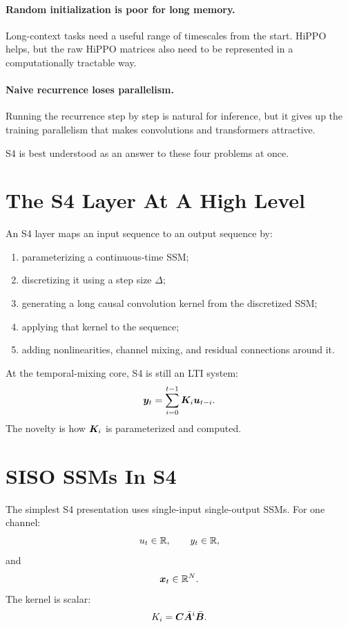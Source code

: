 \paragraph{Random initialization is poor for long memory.}
Long-context tasks need a useful range of timescales from the start. HiPPO helps, but the
raw HiPPO matrices also need to be represented in a computationally tractable way.

\paragraph{Naive recurrence loses parallelism.}
Running the recurrence step by step is natural for inference, but it gives up the training
parallelism that makes convolutions and transformers attractive.

S4 is best understood as an answer to these four problems at once.

\section{The S4 Layer At A High Level}

An S4 layer maps an input sequence to an output sequence by:

\begin{enumerate}
  \item parameterizing a continuous-time SSM;
  \item discretizing it using a step size $\Delta$;
  \item generating a long causal convolution kernel from the discretized SSM;
  \item applying that kernel to the sequence;
  \item adding nonlinearities, channel mixing, and residual connections around it.
\end{enumerate}

At the temporal-mixing core, S4 is still an LTI system:
\[
  \bm{y}_t = \sum_{i=0}^{t-1}\bm{K}_i\bm{u}_{t-i}.
\]
The novelty is how $\bm{K}_i$ is parameterized and computed.

\section{SISO SSMs In S4}

The simplest S4 presentation uses single-input single-output SSMs. For one channel:
\[
  u_t \in \mathbb{R},\qquad y_t \in \mathbb{R},
\]
and
\[
  \bm{x}_t \in \mathbb{R}^N.
\]
The kernel is scalar:
\[
  K_i = \bm{C}\bar{\bm{A}}^i\bar{\bm{B}}.
\]

